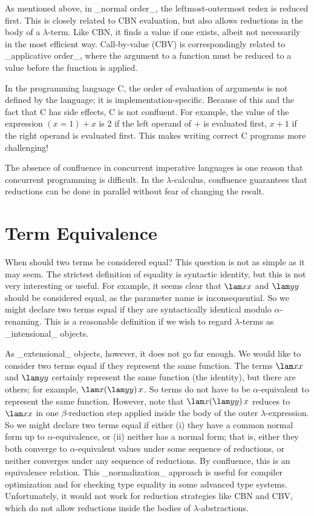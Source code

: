 As mentioned above, in _normal order_, the leftmost-outermost redex is
reduced first.  This is closely related to CBN evaluation, but also
allows reductions in the body of a $\lambda$-term.  Like CBN, it finds
a value if one exists, albeit not necessarily in the most efficient
way.  Call-by-value (CBV) is correspondingly related to _applicative
order_, where the argument to a function must be reduced to a value
before the function is applied.

In the programming language C, the order of evaluation of arguments is
not defined by the language; it is implementation-specific. Because of
this and the fact that C has side effects, C is not confluent. For
example, the value of the expression $(x=1) + x$ is 2 if the left
operand of $+$ is evaluated first, $x+1$ if the right operand is
evaluated first. This makes writing correct C programs more
challenging!

The absence of confluence in concurrent imperative languages is one
reason that concurrent programming is difficult. In the
$\lambda$-calculus, confluence guarantees that reductions can be done
in parallel without fear of changing the result.


\section{Term Equivalence}

When should two terms be considered equal? This question is not as
simple as it may seem. The strictest definition of equality is
syntactic identity, but this is not very interesting or useful. For
example, it seems clear that $\lam xx$ and $\lam yy$ should be
considered equal, as the parameter name is inconsequential. So we
might declare two terms equal if they are syntactically identical
modulo $\alpha$-renaming. This is a reasonable definition if we wish
to regard $\lambda$-terms as _intensional_ objects.

As _extensional_ objects, however, it does not go far enough. We would
like to consider two terms equal if they represent the same
function. The terms $\lam xx$ and $\lam yy$ certainly represent the
same function (the identity), but there are others; for example, $\lam
x{(\lam yy)}\,x$. So terms do not have to be $\alpha$-equivalent to
represent the same function.  However, note that $\lam x{(\lam
yy)}\,x$ reduces to $\lam xx$ in one $\beta$-reduction step applied
inside the body of the outer $\lambda$-expression. So we might declare
two terms equal if either (i) they have a common normal form up to
$\alpha$-equivalence, or (ii) neither has a normal form; that is,
either they both converge to $\alpha$-equivalent values under some
sequence of reductions, or neither converges under any sequence of
reductions. By confluence, this is an equivalence relation. This
_normalization_ approach is useful for compiler optimization and for
checking type equality in some advanced type systems. Unfortunately,
it would not work for reduction strategies like CBN and CBV, which do
not allow reductions inside the bodies of $\lambda$-abstractions.

